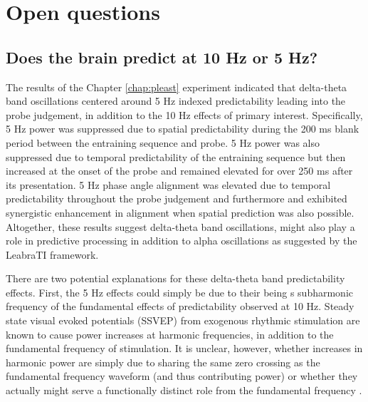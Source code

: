 \documentclass[dwyatte_dissertation.tex]{subfiles}
\begin{document}
\section{Open questions}

\subsection{Does the brain predict at 10 Hz or 5 Hz?}
The results of the Chapter \ref{chap:pleast} experiment indicated that delta-theta band oscillations centered around 5 Hz indexed predictability leading into the probe judgement, in addition to the 10 Hz effects of primary interest. Specifically, 5 Hz power was suppressed due to spatial predictability during the 200 ms blank period between the entraining sequence and probe. 5 Hz power was also suppressed due to temporal predictability of the entraining sequence but then increased at the onset of the probe and remained elevated for over 250 ms after its presentation. 5 Hz phase angle alignment was elevated due to temporal predictability throughout the probe judgement and furthermore and exhibited synergistic enhancement in alignment when spatial prediction was also possible. Altogether, these results suggest delta-theta band oscillations, might also play a role in predictive processing in addition to alpha oscillations as suggested by the LeabraTI framework.

There are two potential explanations for these delta-theta band predictability effects. First, the 5 Hz effects could simply be due to their being s subharmonic frequency of the fundamental effects of predictability observed at 10 Hz. Steady state visual evoked potentials (SSVEP) from exogenous rhythmic stimulation are known to cause power increases at harmonic frequencies, in addition to the fundamental frequency of stimulation. It is unclear, however, whether increases in harmonic power are simply due to sharing the same zero crossing as the fundamental frequency waveform (and thus contributing power) or whether they actually might serve a functionally distinct role from the fundamental frequency \cite[e.g.,]{Herrmann01,KimGraboweckyPallerEtAl11}. 
\end{document}
